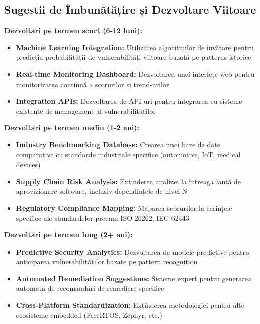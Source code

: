 \documentclass[12pt,a4paper]{article}
\begin{document}
\subsection{Sugestii de Îmbunătățire și Dezvoltare Viitoare}

\textbf{Dezvoltări pe termen scurt (6-12 luni):}

\begin{itemize}
\item \textbf{Machine Learning Integration:} Utilizarea algoritmilor de învățare pentru predicția probabilității de vulnerabilități viitoare bazată pe patterns istorice
\item \textbf{Real-time Monitoring Dashboard:} Dezvoltarea unei interfețe web pentru monitorizarea continuă a scorurilor și trend-urilor
\item \textbf{Integration APIs:} Dezvoltarea de API-uri pentru integrarea cu sisteme existente de management al vulnerabilităților
\end{itemize}

\textbf{Dezvoltări pe termen mediu (1-2 ani):}

\begin{itemize}
\item \textbf{Industry Benchmarking Database:} Crearea unei baze de date comparative cu standarde industriale specifice (automotive, IoT, medical devices)
\item \textbf{Supply Chain Risk Analysis:} Extinderea analizei la întreaga lanță de aprovizionare software, inclusiv dependințele de nivel N
\item \textbf{Regulatory Compliance Mapping:} Maparea scorurilor la cerințele specifice ale standardelor precum ISO 26262, IEC 62443
\end{itemize}

\textbf{Dezvoltări pe termen lung (2+ ani):}

\begin{itemize}
\item \textbf{Predictive Security Analytics:} Dezvoltarea de modele predictive pentru anticiparea vulnerabilităților bazate pe pattern recognition
\item \textbf{Automated Remediation Suggestions:} Sisteme expert pentru generarea automată de recomandări de remediere specifice
\item \textbf{Cross-Platform Standardization:} Extinderea metodologiei pentru alte ecosisteme embedded (FreeRTOS, Zephyr, etc.)
\end{itemize}
\end{document}
